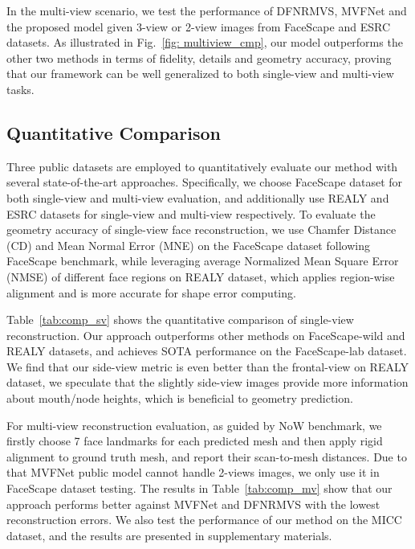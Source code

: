 \documentclass[10pt,twocolumn,letterpaper]{article}
\begin{document}
In the multi-view scenario, we test the performance of DFNRMVS\cite{bai2020deep}, MVFNet\cite{wu2019mvf} and the proposed model given 3-view or 2-view images from FaceScape and ESRC datasets. As illustrated in Fig.~\ref{fig: multiview_cmp}, our model outperforms the other two methods in terms of fidelity, details and geometry accuracy, proving that our framework can be well generalized to both single-view and multi-view tasks.

 
\subsection{Quantitative Comparison}
Three public datasets are employed to quantitatively evaluate our method with several state-of-the-art approaches. Specifically, we choose FaceScape\cite{zhu2021facescape} dataset for both single-view and multi-view evaluation, and additionally use REALY\cite{REALY} and ESRC\cite{ESRC} datasets for single-view and multi-view respectively. To evaluate the geometry accuracy of single-view face reconstruction, we use Chamfer Distance (CD) and Mean Normal Error (MNE) on the FaceScape dataset following FaceScape benchmark\cite{zhu2021facescape}, while leveraging average Normalized Mean Square Error (NMSE) of different face regions on REALY dataset, which applies region-wise alignment and is more accurate for shape error computing. 

Table~\ref{tab:comp_sv} shows the quantitative comparison of single-view reconstruction. Our approach outperforms other methods on FaceScape-wild and REALY datasets, and achieves SOTA performance on the FaceScape-lab dataset. We find that our side-view metric is even better than the frontal-view on REALY dataset, we speculate that the slightly side-view images provide more information about mouth/node heights, which is beneficial to geometry prediction.

For multi-view reconstruction evaluation, as guided by NoW benchmark\cite{RingNet:CVPR:2019}, we firstly choose 7 face landmarks for each predicted mesh and then apply rigid alignment to ground truth mesh, and report their scan-to-mesh distances. Due to that MVFNet public model cannot handle 2-views images, we only use it in FaceScape dataset testing. The results in Table~\ref{tab:comp_mv} show that our approach performs better
against MVFNet and DFNRMVS with the lowest reconstruction errors. We also test the performance of our method on the MICC dataset\cite{bagdanov2011florence}, and the results are presented in supplementary materials.
\end{document}
